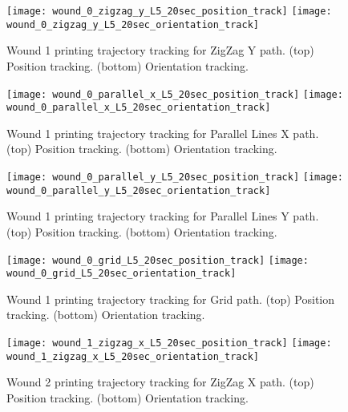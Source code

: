 \begin{figure}[htbp]
	\centering
	\texttt{[image: wound\_0\_zigzag\_y\_L5\_20sec\_position\_track]}
	\texttt{[image: wound\_0\_zigzag\_y\_L5\_20sec\_orientation\_track]}
\caption[Wound 1 printing trajectory tracking for ZigZag Y path.]{Wound 1 printing trajectory tracking for ZigZag Y path. (top) Position tracking. (bottom) Orientation tracking.}
	\label{fig:simulation_test_results_appendix_trajectory_tracking_wound_1_zizzag_y_tracking}
\end{figure}

\begin{figure}[htbp]
	\centering
	\texttt{[image: wound\_0\_parallel\_x\_L5\_20sec\_position\_track]}
	\texttt{[image: wound\_0\_parallel\_x\_L5\_20sec\_orientation\_track]}
	\caption[Wound 1 printing trajectory tracking for Parallel Lines X path.]{Wound 1 printing trajectory tracking for Parallel Lines X path. (top) Position tracking. (bottom) Orientation tracking.}
	\label{fig:simulation_test_results_appendix_trajectory_tracking_wound_1_parallel_x_tracking}
\end{figure}

\begin{figure}[htbp]
	\centering
	\texttt{[image: wound\_0\_parallel\_y\_L5\_20sec\_position\_track]}
	\texttt{[image: wound\_0\_parallel\_y\_L5\_20sec\_orientation\_track]}
    \caption[Wound 1 printing trajectory tracking for Parallel Lines Y path.]{Wound 1 printing trajectory tracking for Parallel Lines Y path. (top) Position tracking. (bottom) Orientation tracking.}
	\label{fig:simulation_test_results_appendix_trajectory_tracking_wound_1_parallel_y_tracking}
\end{figure}

\begin{figure}[htbp]
	\centering
	\texttt{[image: wound\_0\_grid\_L5\_20sec\_position\_track]}
	\texttt{[image: wound\_0\_grid\_L5\_20sec\_orientation\_track]}
    \caption[Wound 1 printing trajectory tracking for Grid path.]{Wound 1 printing trajectory tracking for Grid path. (top) Position tracking. (bottom) Orientation tracking.}
	\label{fig:simulation_test_results_appendix_trajectory_tracking_wound_1_grid_tracking}
\end{figure}


\begin{figure}[htbp]
	\centering
	\texttt{[image: wound\_1\_zigzag\_x\_L5\_20sec\_position\_track]}
	\texttt{[image: wound\_1\_zigzag\_x\_L5\_20sec\_orientation\_track]}
	\caption[Wound 2 printing trajectory tracking for ZigZag X path.]{Wound 2 printing trajectory tracking for ZigZag X path. (top) Position tracking. (bottom) Orientation tracking.}
    \label{fig:simulation_test_results_appendix_trajectory_tracking_wound_2_zizzag_x_tracking}
\end{figure}

